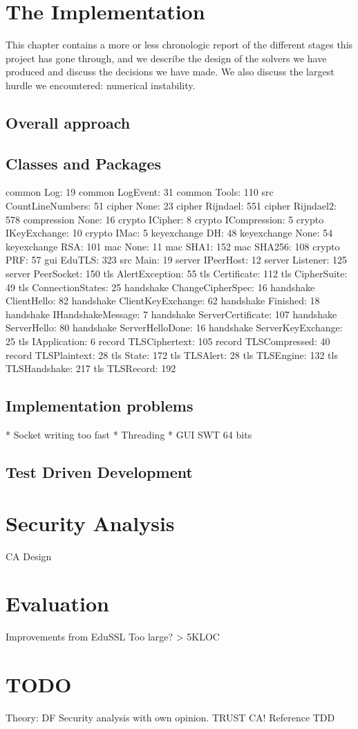 \documentclass[12pt,a4paper,titlepage]{report}
\begin{document}
\chapter{The Implementation}

This chapter contains a more or less chronologic report of the different stages
this project has gone through, and we describe the design of the solvers we have
produced and discuss the decisions we have made. We also discuss the largest
hurdle we encountered: numerical instability.

\section{Overall approach}

\section{Classes and Packages}

common Log: 19
common LogEvent: 31
common Tools: 110
src CountLineNumbers: 51
cipher None: 23
cipher Rijndael: 551
cipher Rijndael2: 578
compression None: 16
crypto ICipher: 8
crypto ICompression: 5
crypto IKeyExchange: 10
crypto IMac: 5
keyexchange DH: 48
keyexchange None: 54
keyexchange RSA: 101
mac None: 11
mac SHA1: 152
mac SHA256: 108
crypto PRF: 57
gui EduTLS: 323
src Main: 19
server IPeerHost: 12
server Listener: 125
server PeerSocket: 150
tls AlertException: 55
tls Certificate: 112
tls CipherSuite: 49
tls ConnectionStates: 25
handshake ChangeCipherSpec: 16
handshake ClientHello: 82
handshake ClientKeyExchange: 62
handshake Finished: 18
handshake IHandshakeMessage: 7
handshake ServerCertificate: 107
handshake ServerHello: 80
handshake ServerHelloDone: 16
handshake ServerKeyExchange: 25
tls IApplication: 6
record TLSCiphertext: 105
record TLSCompressed: 40
record TLSPlaintext: 28
tls State: 172
tls TLSAlert: 28
tls TLSEngine: 132
tls TLSHandshake: 217
tls TLSRecord: 192

\section{Implementation problems}
* Socket writing too fast
* Threading
* GUI SWT 64 bits

\section{Test Driven Development}

\chapter{Security Analysis}
CA
Design


\chapter{Evaluation}
Improvements from EduSSL
Too large? > 5KLOC

\chapter{TODO}
Theory: DF
Security analysis with own opinion. TRUST CA!
Reference
TDD
\end{document}

